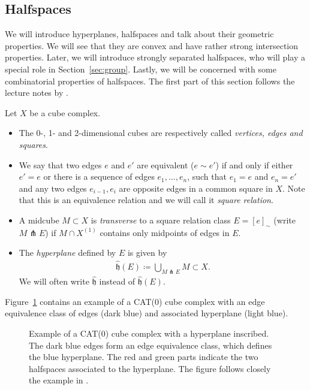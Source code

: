 \subsection{Halfspaces}
\label{sec:halfspaces}
We will introduce hyperplanes, halfspaces and talk about their geometric properties. We will see that they are convex and have rather strong intersection properties. Later, we will introduce strongly separated halfspaces, who will play a special role in Section~\ref{sec:group}. Lastly, we will be concerned with some combinatorial properties of halfspaces. The first part of this section follows the lecture notes by \textcite{Rolli2012}.

\begin{defin}[Hyperplanes]
  Let \(X\) be a cube complex.
  \begin{itemize}
  \item The 0-, 1- and 2-dimensional cubes are respectively called \emph{vertices, edges and squares}.
  \item We say that two edges \(e\) and \(e'\) are equivalent (\(e \sim e'\)) if and only if either \(e' = e\) or there is a sequence of edges \(e_1, \dots, e_n\), such that \(e_1 = e\) and \(e_n = e'\) and any two edges \(e_{i-1}, e_i\) are opposite edges in a common square in \(X\). Note that this is an equivalence relation and we will call it \emph{square relation}.
  \item A midcube \(M \subset X\) is \emph{transverse} to a square relation class \(E = [e]_\sim\) (write \(M \pitchfork E\)) if \(M \cap X^{(1)}\) contains only midpoints of edges in \(E\).
  \item The \emph{hyperplane} defined by \(E\) is given by
    \begin{align*}
      \mathfrak{\hat h}(E) \coloneqq \bigcup_{M \pitchfork E} M \subset X.
    \end{align*}
    We will often write \(\mathfrak{\hat h}\) instead of \(\mathfrak{\hat h}(E)\).
  \end{itemize}
\end{defin}

\begin{bsp}
  Figure~\ref{fig:hyperplanes} contains an example of a CAT(0) cube complex with an edge equivalence class of edges (dark blue) and associated hyperplane (light blue). 
  \begin{figure}[htbp]
    \centering
    
    \caption{Example of a CAT(0) cube complex with a hyperplane inscribed. The dark blue edges form an edge equivalence class, which defines the blue hyperplane. The red and green parts indicate the two halfspaces associated to the hyperplane. The figure follows closely the example in \textcite{sageev-lecture-notes}.}
    \label{fig:hyperplanes}
  \end{figure}
\end{bsp}

